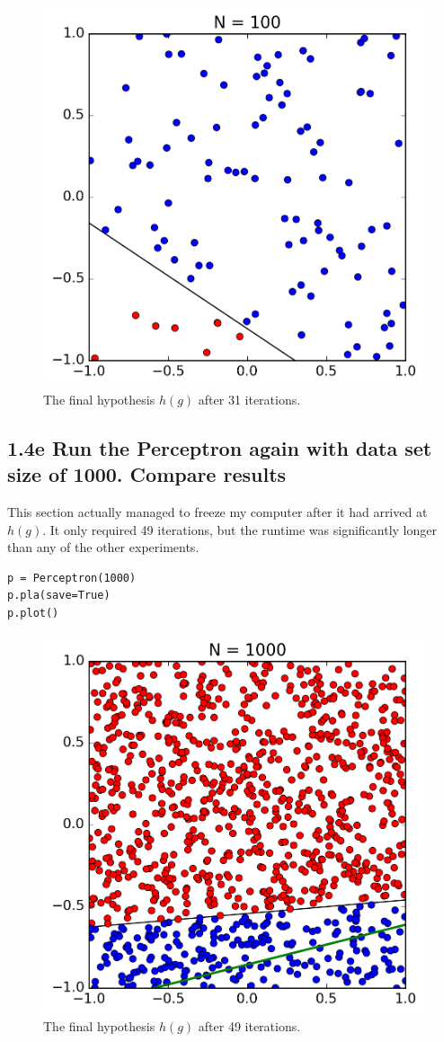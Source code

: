\documentclass[11pt]{article}
\begin{document}
\begin{figure}[!htb]
	\includegraphics{14d.png}
	\caption{The final hypothesis $h(g)$ after 31 iterations.}
\end{figure}
\newpage

\subsection*{1.4e Run the Perceptron again with data set size of 1000. Compare results}

This section actually managed to freeze my computer after it had arrived at $h(g)$. It only required 49 iterations, but the runtime was significantly longer than any of the other experiments.

\begin{lstlisting}[frame=single]
p = Perceptron(1000)
p.pla(save=True)
p.plot()
\end{lstlisting}

\begin{figure}[!htb]
	\includegraphics{14e.png}
	\caption{The final hypothesis $h(g)$ after 49 iterations.}
\end{figure}
\end{document}
